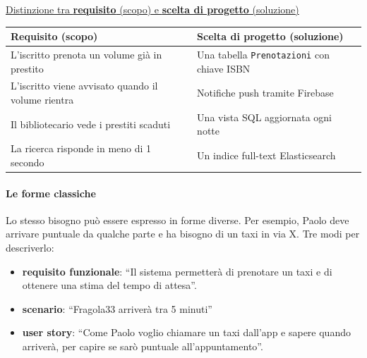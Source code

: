 \documentclass[12pt]{extarticle}
\begin{document}
\noindent \underline{Distinzione tra \textbf{requisito} (scopo) e \textbf{scelta di progetto} (soluzione)}
\begin{center}
\small
\begin{tabular}{p{7.4cm}p{7.4cm}}
    \toprule
    \textbf{Requisito (scopo)} & \textbf{Scelta di progetto (soluzione)} \\
    \midrule
    L'iscritto prenota un volume già in prestito & Una tabella \texttt{Prenotazioni} con chiave ISBN \\
    \addlinespace
    L'iscritto viene avvisato quando il volume rientra & Notifiche push tramite Firebase \\
    \addlinespace
    Il bibliotecario vede i prestiti scaduti & Una vista SQL aggiornata ogni notte \\
    \addlinespace
    La ricerca risponde in meno di 1 secondo & Un indice full-text Elasticsearch \\
    \bottomrule
\end{tabular}
\end{center}

\paragraph{Le forme classiche} Lo stesso bisogno può essere espresso in forme diverse. Per esempio, Paolo deve arrivare puntuale da qualche parte e ha bisogno di un taxi in via X. Tre modi per descriverlo:
\begin{itemize}
    \item \textbf{requisito funzionale}: ``Il sistema permetterà di prenotare un taxi e di ottenere una stima del tempo di attesa''.
    \item \textbf{scenario}: ``Fragola33 arriverà tra 5 minuti''
    \item \textbf{user story}: ``Come Paolo voglio chiamare un taxi dall'app e sapere quando arriverà, per capire se sarò puntuale all'appuntamento''.
\end{itemize}

\newpage
\end{document}
